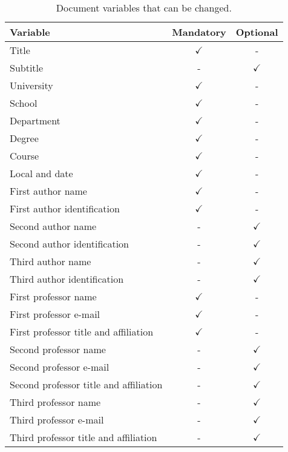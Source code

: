 \begin{table}[!htpb]
    \centering
    \caption{Document variables that can be changed.}
    \label{tab:doc-variables}
    \begin{tabular}{lcc}
        \toprule
            \textbf{Variable} & \textbf{Mandatory} & \textbf{Optional} \\
        \midrule
            Title & $\checkmark$ & - \\
            Subtitle & - & $\checkmark$ \\
            University & $\checkmark$ & - \\
            School & $\checkmark$ & - \\
            Department & $\checkmark$ & - \\
            Degree & $\checkmark$ & - \\
            Course & $\checkmark$ & - \\
            Local and date & $\checkmark$ & - \\ 
            
            First author name & $\checkmark$ & - \\
            First author identification & $\checkmark$ & - \\ 

            Second author name & - & $\checkmark$ \\
            Second author identification & - & $\checkmark$ \\ 

            Third author name & - & $\checkmark$ \\
            Third author identification & - & $\checkmark$ \\ 

            First professor name & $\checkmark$ & - \\
            First professor e-mail & $\checkmark$ & - \\
            First professor title and affiliation & $\checkmark$ & - \\ 

            Second professor name & - & $\checkmark$ \\
            Second professor e-mail & - & $\checkmark$ \\
            Second professor title and affiliation & - & $\checkmark$ \\ 

            Third professor name & - & $\checkmark$ \\
            Third professor e-mail & - & $\checkmark$ \\
            Third professor title and affiliation & - & $\checkmark$ \\
        \bottomrule
    \end{tabular}
\end{table}